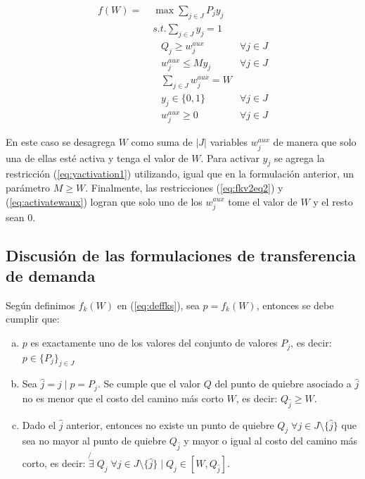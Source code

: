 \begin{align}
  f(W) =\; & \max \sum_{j \in J} P_j y_j             & \label{eq:fkv2eq1}\\
           & s.t. \sum_{j \in J} y_j = 1            & \label{eq:fkv2eq2}\\
           & \;\;\; Q_j \geq w^{aux}_j              & \forall j \in J \label{eq:implfkoriginalineq} \\
           & \;\;\; w^{aux}_j \leq M y_j            & \forall j \in J \label{eq:yactivation1} \\
           & \;\;\; \sum_{j \in J} w^{aux}_j = W    & \label{eq:activatewaux} \\
           & \;\;\; y_j \in \{0,1\}                 & \label{eq:fkv2domainy} \forall j \in J\\
           & \;\;\; w^{aux}_j \geq 0                & \label{eq:fkv2eq6} \forall j \in J
\end{align}

\clearpage
En este caso se desagrega $W$ como suma de $|J|$ variables $w^{aux}_j$ de manera que solo una de ellas esté activa y tenga el valor de $W$. Para activar $y_j$ se agrega la restricción (\ref{eq:yactivation1}) utilizando, igual que en la formulación anterior, un parámetro $M \geq W$. Finalmente, las restricciones (\ref{eq:fkv2eq2}) y (\ref{eq:activatewaux}) logran que solo uno de los $w^{aux}_j$ tome el valor de $W$ y el resto sean 0.

\subsection{Discusión de las formulaciones de transferencia de demanda}

Según definimos $f_k(W)$ en (\ref{eq:deffks}), sea $p = f_k(W)$, entonces se debe cumplir que:

\begin{enumerate}[(a)]
  \item {\label{deffpt1} $p$ es exactamente uno de los valores del conjunto de valores $P_j$, es decir: $p \in \{P_j\}_{j \in J}$}
  \item {\label{deffpt2} Sea $\hat{j} = j \;|\; p = P_j$. Se cumple que el valor $Q$ del punto de quiebre asociado a $\hat{j}$ no es menor que el costo del camino más corto $W$, es decir: $Q_{\hat{j}} \geq W$.}
  \item {\label{deffpt3} Dado el $\hat{j}$ anterior, entonces no existe un punto de quiebre $Q_j \; \forall j \in J\setminus\{\hat{j}\}$ que sea no mayor al punto de quiebre $Q_{\hat{j}}$ y mayor o igual al costo del camino más corto, es decir: $\not{\exists}\; Q_j\; \forall j \in J\setminus\{\hat{j}\} \;|\; Q_j \in  [W, Q_{\hat{j}}]$}.
\end{enumerate}

